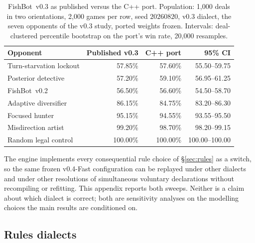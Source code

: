 \documentclass[11pt]{article}
\theoremstyle{definition}
\DeclareRobustCommand{\vfast}{\texorpdfstring{\mbox{v0.4-Fast}}{v0.4-Fast}}
\DeclareRobustCommand{\vthree}{\texorpdfstring{\mbox{FishBot v0.3}}{FishBot v0.3}}
\DeclareRobustCommand{\vtwo}{\texorpdfstring{\mbox{FishBot v0.2}}{FishBot v0.2}}
\newcommand{\numBootstrapDraws}{20{,}000}
\newcommand{\numPortDeals}{1{,}000}
\newcommand{\numPortGames}{2{,}000}
\begin{document}
\begin{table}[!htbp]
\centering
\caption{\vthree{} as published \cite{fishbot03} versus the C++ port. Population:
\numPortDeals{} deals in two orientations, \numPortGames{} games per row, seed
$20260820$, v0.3 dialect, the seven opponents of the v0.3 study, ported weights
frozen. Intervals: deal-clustered percentile bootstrap on the port's win rate,
\numBootstrapDraws{} resamples.}
\label{tab:port}
\small
\begin{tabular}{lrrr}
\toprule
Opponent & Published v0.3 & C++ port & 95\% CI \\
\midrule
Turn-starvation lockout & 57.85\% & 57.60\% & 55.50--59.75 \\
Posterior detective & 57.20\% & 59.10\% & 56.95--61.25 \\
\vtwo{} & 56.50\% & 56.60\% & 54.50--58.70 \\
Adaptive diversifier & 86.15\% & 84.75\% & 83.20--86.30 \\
Focused hunter & 95.15\% & 94.55\% & 93.55--95.50 \\
Misdirection artist & 99.20\% & 98.70\% & 98.20--99.15 \\
Random legal control & 100.00\% & 100.00\% & 100.00--100.00 \\
\bottomrule
\end{tabular}%
\end{table}

The engine implements every consequential rule choice of \S\ref{sec:rules} as a
switch, so the same frozen \vfast{} configuration can be replayed under other
dialects and under other resolutions of simultaneous voluntary declarations
without recompiling or refitting. This appendix reports both sweeps. Neither is
a claim about which dialect is correct; both are sensitivity analyses on the
modelling choices the main results are conditioned on.

\subsection{Rules dialects}
\label{app:dialects-rules}
\end{document}
